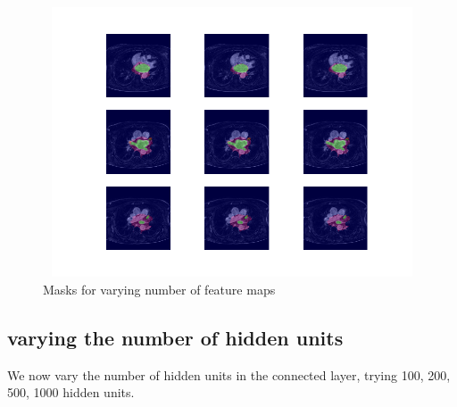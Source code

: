 \begin{figure}
\centering
\includegraphics[trim=2.5cm 1.5cm 2cm 1.5cm, clip=true, height=80mm, width=150mm]{Chapter3/mask_results_varying_number_of_feature_maps.png}
\caption{Masks for varying number of feature maps}
\end{figure}

\subsection{varying the number of hidden units}

\noindent We now vary the number of hidden units in the connected layer, trying 100, 200, 500, 1000 hidden units. \\

